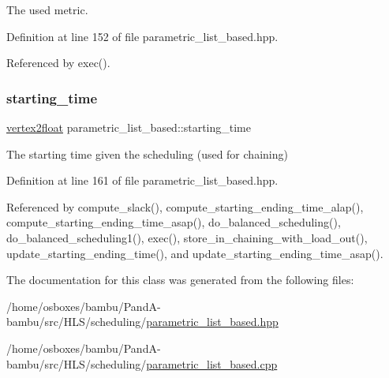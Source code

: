 The used metric. 



Definition at line 152 of file parametric\+\_\+list\+\_\+based.\+hpp.



Referenced by exec().

\mbox{\label{classparametric__list__based_a48af95dd945034fdad7f1f0d5502c13c}} 
\subsubsection{\texorpdfstring{starting\+\_\+time}{starting\_time}}
{\footnotesize\ttfamily \hyperlink{structvertex2float}{vertex2float} parametric\+\_\+list\+\_\+based\+::starting\+\_\+time\hspace{0.3cm}{\ttfamily [private]}}



The starting time given the scheduling (used for chaining) 



Definition at line 161 of file parametric\+\_\+list\+\_\+based.\+hpp.



Referenced by compute\+\_\+slack(), compute\+\_\+starting\+\_\+ending\+\_\+time\+\_\+alap(), compute\+\_\+starting\+\_\+ending\+\_\+time\+\_\+asap(), do\+\_\+balanced\+\_\+scheduling(), do\+\_\+balanced\+\_\+scheduling1(), exec(), store\+\_\+in\+\_\+chaining\+\_\+with\+\_\+load\+\_\+out(), update\+\_\+starting\+\_\+ending\+\_\+time(), and update\+\_\+starting\+\_\+ending\+\_\+time\+\_\+asap().



The documentation for this class was generated from the following files\+:\begin{DoxyCompactItemize}
\item 
/home/osboxes/bambu/\+Pand\+A-\/bambu/src/\+H\+L\+S/scheduling/\hyperlink{parametric__list__based_8hpp}{parametric\+\_\+list\+\_\+based.\+hpp}\item 
/home/osboxes/bambu/\+Pand\+A-\/bambu/src/\+H\+L\+S/scheduling/\hyperlink{parametric__list__based_8cpp}{parametric\+\_\+list\+\_\+based.\+cpp}\end{DoxyCompactItemize}
